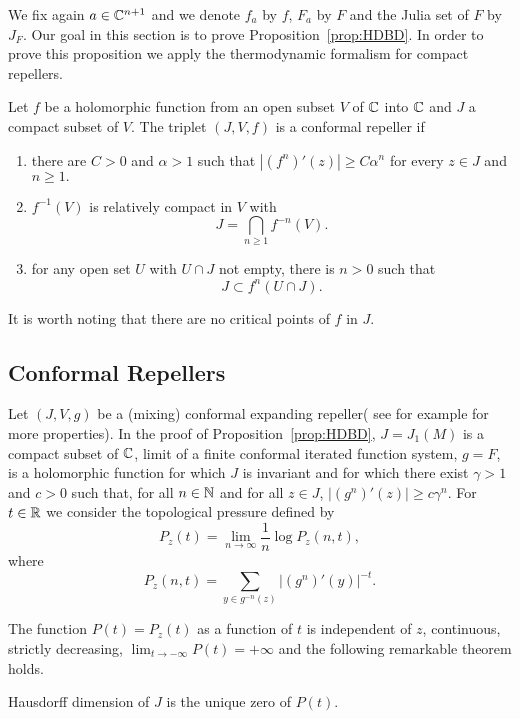 We fix again $a\in{\mathbb C}^{n+1}$ and we denote $f_a$ by $f$, $F_a$ by $F$ and
the Julia set of $F$ by $J_F. $ Our goal in this section is to prove
Proposition~\ref{prop:HDBD}. In order to prove this proposition we apply the
thermodynamic formalism for compact repellers.

\begin{definition}
  Let $f$ be a holomorphic function from an open subset $V$ of ${\mathbb C}$ into
  ${\mathbb C}$ and $J$ a compact subset of $V.$ The triplet $(J, V, f)$ is a
  conformal repeller if
  \begin{enumerate}
  \item there are $C>0$ and $\alpha >1$ such that $|(f^n)'(z)|\geq
    C\alpha^n$ for every $z\in J$ and $n\geq 1.$
  \item $f^{-1}(V)$ is relatively compact in $V$ with
      \[J=\bigcap_{n\geq 1}f^{-n}(V).\]
    \item for any open set $U$ with $U\cap J$ not empty, there is $n>0$ such
      that \[J\subset f^n(U\cap J).\]
  \end{enumerate}
\end{definition}

It is worth noting that there are no critical points of $f$ in $J.$ 

\subsection{Conformal Repellers}

Let $(J,V,g)$ be a (mixing) conformal expanding repeller( see for example
\cite{zinnmeister:thermodynamic} for more properties). In the proof of
Proposition~\ref{prop:HDBD}, $J=J_1(M)$ is a compact subset of ${\mathbb C}$, limit
of a finite conformal iterated function system, $g=F$, is a holomorphic
function for which $J$ is invariant and for which there exist $\gamma >1$
and $c>0 $ such that, for all $n\in{\mathbb N}$ and for all $z\in J$,
$|(g^n)'(z)|\geq c \gamma^n$.  For $t\in{\mathbb R}$ we consider the topological
pressure defined by
\[
P_z(t)=\lim_{n\rightarrow\infty}\frac{1}{n}\log P_z(n,t),
\]
where
\[
P_z(n,t)=\sum_{y\in g^{-n}(z)} |(g^n)'(y)|^{-t}.
\]

The function $P(t)=P_z(t)$ as a function of $t$ is independent of $z$,
continuous, strictly decreasing, $\lim_{t\to -\infty} P(t)=+\infty$ and the
following remarkable theorem holds.

\begin{theorem}
  Hausdorff dimension of $J$ is the unique zero of $P(t)$.
\end{theorem}

